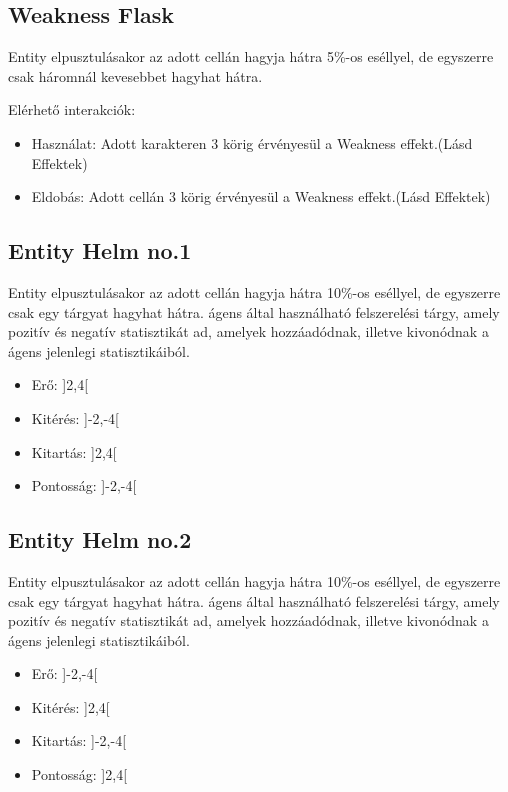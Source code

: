 \subsection{Weakness Flask}

Entity elpusztulásakor az adott cellán hagyja hátra 5\%-os eséllyel, de egyszerre csak háromnál kevesebbet hagyhat hátra.

\noindent Elérhető interakciók:
\begin{itemize}
    \item Használat: Adott karakteren 3 körig érvényesül a Weakness effekt.(Lásd Effektek)
    \item Eldobás: Adott cellán 3 körig érvényesül a Weakness effekt.(Lásd Effektek)
\end{itemize}

\subsection{Entity Helm no.1}

Entity elpusztulásakor az adott cellán hagyja hátra 10\%-os eséllyel, de egyszerre csak egy tárgyat hagyhat hátra.
ágens által használható felszerelési tárgy, amely pozitív és negatív statisztikát ad, amelyek hozzáadódnak, illetve kivonódnak a ágens jelenlegi statisztikáiból.

\begin{itemize}
    \item Erő: ]2,4[
    \item Kitérés: ]-2,-4[
    \item Kitartás: ]2,4[
    \item Pontosság: ]-2,-4[
\end{itemize}

\subsection{Entity Helm no.2}

Entity elpusztulásakor az adott cellán hagyja hátra 10\%-os eséllyel, de egyszerre csak egy tárgyat hagyhat hátra.
ágens által használható felszerelési tárgy, amely pozitív és negatív statisztikát ad, amelyek hozzáadódnak, illetve kivonódnak a ágens jelenlegi statisztikáiból.

\begin{itemize}
    \item Erő: ]-2,-4[
    \item Kitérés: ]2,4[
    \item Kitartás: ]-2,-4[
    \item Pontosság: ]2,4[
\end{itemize}

